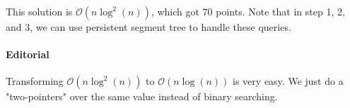 This solution is $\mathcal{O}(n\log^2(n))$, which got 70 points. Note that in step 1, 2, and 3, we can use persistent segment tree to handle these queries.

\paragraph{Editorial}

Transforming $\mathcal{O}(n\log^2(n))$ to $\mathcal{O}(n\log(n))$ is very easy.
We just do a "two-pointers" over the same value instead of binary searching.



